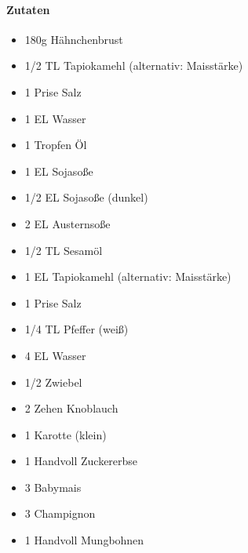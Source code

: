 \clearpage
{}

\paragraph{Zutaten}
\begin{itemize}[noitemsep]
	\item 180g Hähnchenbrust
	\item 1/2 TL Tapiokamehl (alternativ: Maisstärke)
	\item 1 Prise Salz
	\item 1 EL Wasser
	\item 1 Tropfen Öl
	\vspace{0.5cm}
	\item 1 EL Sojasoße
	\item 1/2 EL Sojasoße (dunkel)
	\item 2 EL Austernsoße 
	\item 1/2 TL Sesamöl
	\item 1 EL Tapiokamehl (alternativ: Maisstärke)
	\item 1 Prise Salz
	\item 1/4 TL Pfeffer (weiß)
	\item 4 EL Wasser
	\vspace{0.5cm}
	\item 1/2 Zwiebel
	\item 2 Zehen Knoblauch
	\item 1 Karotte (klein)
	\item 1 Handvoll Zuckererbse
	\item 3 Babymais
	\item 3 Champignon
	\item 1 Handvoll Mungbohnen
\end{itemize}


